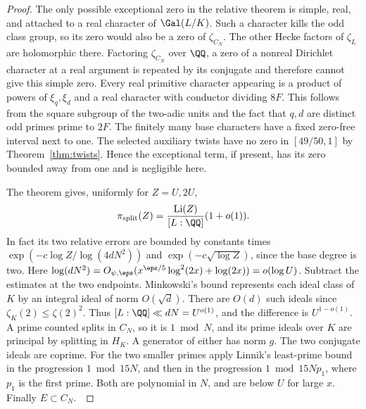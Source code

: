 \documentclass[a4paper,11pt]{article}
\theoremstyle{definition}
\theoremstyle{remark}
\numberwithin{equation}{section}
\begin{document}
\begin{proof}
The only possible exceptional zero in the relative theorem is simple,
real, and attached to a real character of \(\Gal(L/K)\). Such a
character kills the odd class group, so its zero would also be a zero
of \(\zeta_{C_N}\). The other Hecke factors of \(\zeta_L\) are
holomorphic there. Factoring \(\zeta_{C_N}\) over \(\QQ\), a zero of
a nonreal Dirichlet character at a real argument is repeated by its
conjugate and therefore cannot give this simple zero. Every real
primitive character appearing is a product of powers of \(\xi_q,\xi_d\)
and a real character with conductor dividing \(8F\). This follows from
the square subgroup of the two-adic units and the fact that \(q,d\)
are distinct odd primes prime to \(2F\). The finitely many base
characters have a fixed zero-free interval next to one. The selected
auxiliary twists have no zero in \([49/50,1]\) by
Theorem~\ref{thm:twists}. Hence the exceptional term, if present, has
its zero bounded away from one and is negligible here.

The theorem gives, uniformly for \(Z=U,2U\),
\[
     \pi_{\rm split}(Z)=\frac{\operatorname{Li}(Z)}{[L:\QQ]}(1+o(1)).
\]
In fact its two relative errors are bounded by constants times
\(\exp(-c\log Z/\log(4dN^2))\) and
\(\exp(-c\sqrt{\log Z})\), since the base degree is two.
Here \(\log(dN^2)=O_{\psi,\eps}(x^{\eps/5}\log^2(2x)+\log(2x))
=o(\log U)\). Subtract the estimates at the two endpoints.
Minkowski's bound represents each ideal class of \(K\) by an integral
ideal of norm \(O(\sqrt d)\). There are \(O(d)\) such ideals since
\(\zeta_K(2)\le\zeta(2)^2\). Thus \([L:\QQ]\ll dN=U^{o(1)}\), and
the difference is \(U^{1-o(1)}\). A prime counted splits in \(C_N\),
so it is \(1\bmod N\), and its prime ideals over \(K\) are principal
by splitting in \(H_K\). A generator of either has norm \(g\).
The two conjugate ideals are coprime. For the two smaller primes apply
Linnik's least-prime bound in the progression \(1\bmod 15N\), and
then in the progression \(1\bmod 15Np_1\), where \(p_1\) is the
first prime. Both are polynomial in \(N\), and are below \(U\) for
large \(x\). Finally \(E\subset C_N\).~\cite[Thm.~1.4 and
Thm.~3.1]{I-I-I-tz50}\cite[Thm.~1.1]{I-I-I-tzleast50}
\end{proof}
\end{document}
